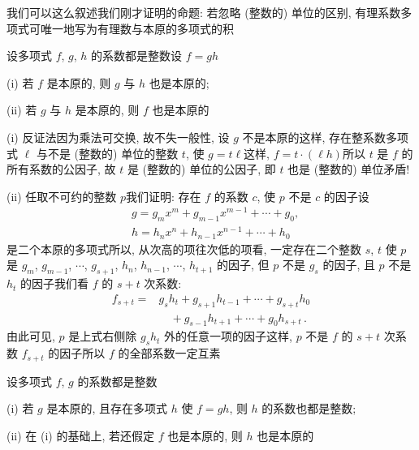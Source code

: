 \begin{remark}
    我们可以这么叙述我们刚才证明的命题: 若忽略 (整数的) 单位的区别, 有理系数多项式可唯一地写为有理数与本原的多项式的积\period
\end{remark}

\begin{proposition}
    设多项式 $f$, $g$, $h$ 的系数都是整数\period 设 $f = gh$\period

    (i) 若 $f$ 是本原的, 则 $g$ 与 $h$ 也是本原的;

    (ii) 若 $g$ 与 $h$ 是本原的, 则 $f$ 也是本原的\period
\end{proposition}

\begin{pf}
    (i) 反证法\period 因为乘法可交换, 故不失一般性, 设 $g$ 不是本原的\period 这样, 存在整系数多项式 $\ell$ 与不是 (整数的) 单位的整数 $t$, 使 $g = t\ell$\period 这样, $f = t \cdot (\ell h)$\period 所以 $t$ 是 $f$ 的所有系数的公因子, 故 $t$ 是 (整数的) 单位的公因子, 即 $t$ 也是 (整数的) 单位\period 矛盾!

    (ii) 任取不可约的整数 $p$\period 我们证明: 存在 $f$ 的系数 $c$, 使 $p$ 不是 $c$ 的因子\period 设
    \begin{align*}
         & g = g_m x^m + g_{m-1} x^{m-1} + \cdots + g_0, \\
         & h = h_n x^n + h_{n-1} x^{n-1} + \cdots + h_0
    \end{align*}
    是二个本原的多项式\period 所以, 从次高的项往次低的项看, 一定存在二个整数 $s$, $t$ 使 $p$ 是 $g_m$, $g_{m-1}$, $\cdots$, $g_{s+1}$, $h_n$, $h_{n-1}$, $\cdots$, $h_{t+1}$ 的因子, 但 $p$ 不是 $g_s$ 的因子, 且 $p$ 不是 $h_t$ 的因子\period 我们看 $f$ 的 $s+t$ 次系数:
    \begin{align*}
        f_{s+t}
        = {} & g_s h_t + g_{s+1} h_{t-1} + \cdots + g_{s+t} h_0         \\
             & \quad + g_{s-1} h_{t+1} + \cdots + g_{0} h_{s+t} \period
    \end{align*}
    由此可见, $p$ 是上式右侧除 $g_s h_t$ 外的任意一项的因子\period 这样, $p$ 不是 $f$ 的 $s+t$ 次系数 $f_{s+t}$ 的因子\period 所以 $f$ 的全部系数一定互素\period
\end{pf}

\begin{proposition}
    设多项式 $f$, $g$ 的系数都是整数\period

    (i) 若 $g$ 是本原的, 且存在多项式 $h$ 使 $f = gh$, 则 $h$ 的系数也都是整数;

    (ii) 在 (i) 的基础上, 若还假定 $f$ 也是本原的, 则 $h$ 也是本原的\period
\end{proposition}

